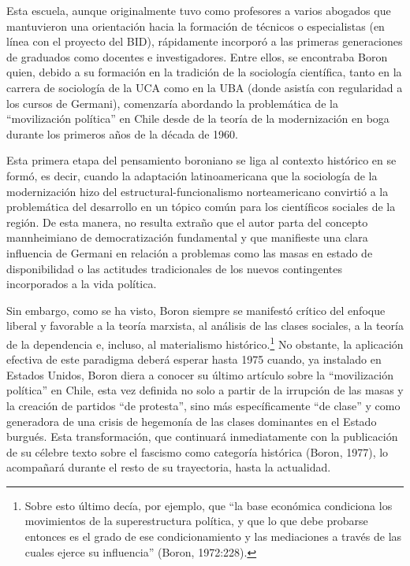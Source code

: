 Esta escuela, aunque originalmente tuvo como profesores a varios abogados que mantuvieron una orientación hacia la formación de técnicos o especialistas (en línea con el proyecto del BID), rápidamente incorporó a las primeras generaciones de graduados como docentes e investigadores. Entre ellos, se encontraba Boron quien, debido a su formación en la tradición de la sociología científica, tanto en la carrera de sociología de la UCA como en la UBA (donde asistía con regularidad a los cursos de Germani), comenzaría abordando la problemática de la ``movilización política'' en Chile desde de la teoría de la modernización en boga durante los primeros años de la década de 1960.

Esta primera etapa del pensamiento boroniano se liga al contexto histórico en se formó, es decir, cuando la adaptación latinoamericana que la sociología de la modernización hizo del estructural-funcionalismo norteamericano convirtió a la problemática del desarrollo en un tópico común para los científicos sociales de la región. De esta manera, no resulta extraño que el autor parta del concepto mannheimiano de democratización fundamental y que manifieste una clara influencia de Germani en relación a problemas como las masas en estado de disponibilidad o las actitudes tradicionales de los nuevos contingentes incorporados a la vida política.

Sin embargo, como se ha visto, Boron siempre se manifestó crítico del enfoque liberal y favorable a la teoría marxista, al análisis de las clases sociales, a la teoría de la dependencia e, incluso, al materialismo histórico.\footnote{Sobre esto último decía, por ejemplo, que ``la base económica condiciona los movimientos de la superestructura política, y que lo que debe probarse entonces es el grado de ese condicionamiento y las mediaciones a través de las cuales ejerce su influencia'' (Boron, 1972:228).} No obstante, la aplicación efectiva de este paradigma deberá esperar hasta 1975 cuando, ya instalado en Estados Unidos, Boron diera a conocer su último artículo sobre la ``movilización política'' en Chile, esta vez definida no solo a partir de la irrupción de las masas y la creación de partidos ``de protesta'', sino más específicamente ``de clase'' y como generadora de una crisis de hegemonía de las clases dominantes en el Estado burgués. Esta transformación, que continuará inmediatamente con la publicación de su célebre texto sobre el fascismo como categoría histórica (Boron, 1977), lo acompañará durante el resto de su trayectoria, hasta la actualidad.

